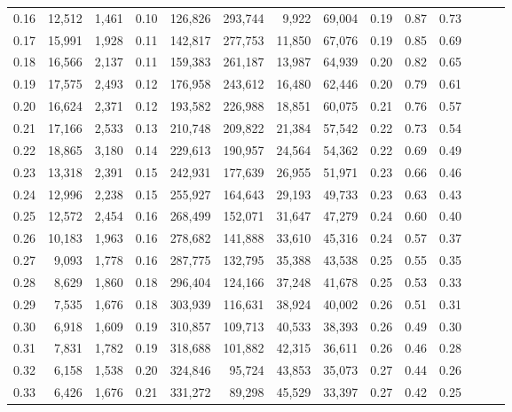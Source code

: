 \begin{tabular}{rrrrrrrrrrrrrr}
0.16 &  12,512 &  1,461 &  0.10 &  126,826 &  293,744 &   9,922 &  69,004 &  0.19 &  0.87 &      0.73 \\
0.17 &  15,991 &  1,928 &  0.11 &  142,817 &  277,753 &  11,850 &  67,076 &  0.19 &  0.85 &      0.69 \\
0.18 &  16,566 &  2,137 &  0.11 &  159,383 &  261,187 &  13,987 &  64,939 &  0.20 &  0.82 &      0.65 \\
0.19 &  17,575 &  2,493 &  0.12 &  176,958 &  243,612 &  16,480 &  62,446 &  0.20 &  0.79 &      0.61 \\
0.20 &  16,624 &  2,371 &  0.12 &  193,582 &  226,988 &  18,851 &  60,075 &  0.21 &  0.76 &      0.57 \\
0.21 &  17,166 &  2,533 &  0.13 &  210,748 &  209,822 &  21,384 &  57,542 &  0.22 &  0.73 &      0.54 \\
0.22 &  18,865 &  3,180 &  0.14 &  229,613 &  190,957 &  24,564 &  54,362 &  0.22 &  0.69 &      0.49 \\
0.23 &  13,318 &  2,391 &  0.15 &  242,931 &  177,639 &  26,955 &  51,971 &  0.23 &  0.66 &      0.46 \\
0.24 &  12,996 &  2,238 &  0.15 &  255,927 &  164,643 &  29,193 &  49,733 &  0.23 &  0.63 &      0.43 \\
0.25 &  12,572 &  2,454 &  0.16 &  268,499 &  152,071 &  31,647 &  47,279 &  0.24 &  0.60 &      0.40 \\
0.26 &  10,183 &  1,963 &  0.16 &  278,682 &  141,888 &  33,610 &  45,316 &  0.24 &  0.57 &      0.37 \\
0.27 &   9,093 &  1,778 &  0.16 &  287,775 &  132,795 &  35,388 &  43,538 &  0.25 &  0.55 &      0.35 \\
0.28 &   8,629 &  1,860 &  0.18 &  296,404 &  124,166 &  37,248 &  41,678 &  0.25 &  0.53 &      0.33 \\
0.29 &   7,535 &  1,676 &  0.18 &  303,939 &  116,631 &  38,924 &  40,002 &  0.26 &  0.51 &      0.31 \\
0.30 &   6,918 &  1,609 &  0.19 &  310,857 &  109,713 &  40,533 &  38,393 &  0.26 &  0.49 &      0.30 \\
0.31 &   7,831 &  1,782 &  0.19 &  318,688 &  101,882 &  42,315 &  36,611 &  0.26 &  0.46 &      0.28 \\
0.32 &   6,158 &  1,538 &  0.20 &  324,846 &   95,724 &  43,853 &  35,073 &  0.27 &  0.44 &      0.26 \\
0.33 &   6,426 &  1,676 &  0.21 &  331,272 &   89,298 &  45,529 &  33,397 &  0.27 &  0.42 &      0.25 \\

\end{tabular}
